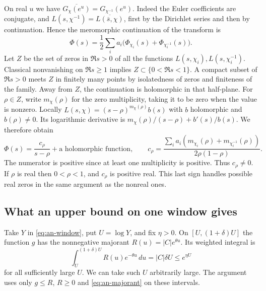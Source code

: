 On real \(u\) we have
\(\overline{G_\chi(e^u)}=G_{\chi^{-1}}(e^u)\). Indeed the Euler
coefficients are conjugate, and \(L(s,\chi^{-1})=
\overline{L(\overline{s},\chi)}\), first by the Dirichlet series and
then by continuation. Hence the meromorphic continuation of the transform is
\[
 \Phi(s)=\frac12\sum_i a_i\bigl(\Phi_{\chi_i}(s)
                                   +\Phi_{\chi_i^{-1}}(s)\bigr).
\]
Let \(Z\) be the set of zeros in \(\Re s>0\) of all the functions
\(L(s,\chi_i), L(s,\chi_i^{-1})\). Classical nonvanishing on
\(\Re s\geq1\) implies \(Z\subset\{0<\Re s<1\}\). A compact subset
of \(\Re s>0\) meets \(Z\) in finitely many points by isolatedness of
zeros and finiteness of the family. Away from \(Z\), the continuation is
holomorphic in that half-plane. For \(\rho\in Z\), write \(m_\chi(\rho)\)
for the zero multiplicity, taking it to be zero when the value is nonzero.
Locally \(L(s,\chi)=(s-\rho)^{m_\chi(\rho)}b(s)\) with \(b\)
holomorphic and \(b(\rho)\ne0\). Its logarithmic derivative is
\(m_\chi(\rho)/(s-\rho)+b'(s)/b(s)\). We therefore obtain
\begin{equation}
 \Phi(s)=\frac{c_\rho}{s-\rho}+\text{a holomorphic function},\qquad
 c_\rho=\frac{\sum_i a_i
             (m_{\chi_i}(\rho)+m_{\chi_i^{-1}}(\rho))}
                    {2\rho(1-\rho)} .
 \label{eq:an-res}
\end{equation}
The numerator is positive since at least one multiplicity is positive.
Thus \(c_\rho\ne0\). If \(\rho\) is real then \(0<\rho<1\), and
\(c_\rho\) is positive real. This last sign handles possible real zeros
in the same argument as the nonreal ones.

\subsection{What an upper bound on one window gives}

Take \(Y\) in \eqref{eq:an-window}, put \(U=\log Y\), and fix
\(\eta>0\). On \([U,(1+\delta)U]\) the function \(g\) has the nonnegative
majorant \(R(u)=|C|e^{\theta u}\). Its weighted integral is
\begin{equation}
 \int_U^{(1+\delta)U}R(u)e^{-\theta u}\,du
         =|C|\delta U\leq e^{\eta U}
 \label{eq:an-majorant}
\end{equation}
for all sufficiently large \(U\). We can take such \(U\) arbitrarily
large. The argument uses only \(g\leq R\), \(R\geq0\) and
\eqref{eq:an-majorant} on these intervals.

